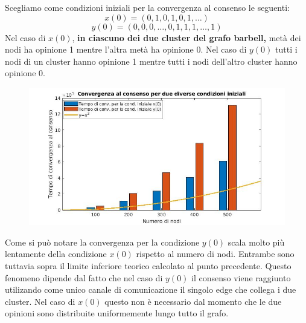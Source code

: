 \begin{alphaparts}
    \questionpart
    Scegliamo come condizioni iniziali per la convergenza al consenso le seguenti:
    \[x(0) = (0,1,0,1,0,1, \dots )\]
    \[y(0) = (0,0,0, \dots ,0,1,1,1, \dots ,1)\]
    Nel caso di \(x(0)\), \textbf{in ciascuno dei due cluster del grafo barbell, }metà dei nodi ha opinione 1 mentre l'altra metà ha opinione 0. Nel caso di \(y(0)\) tutti i nodi di un cluster hanno opinione 1 mentre tutti i nodi dell'altro cluster hanno opinione 0.

    
    \begin{figure}[H]
      \includegraphics[scale=0.45]{figures/es1_plot.jpg}  
    \end{figure}

    Come si può notare la convergenza per la condizione \(y(0)\) scala molto più lentamente della condizione \(x(0)\) rispetto al numero di nodi. Entrambe sono tuttavia sopra il limite inferiore teorico calcolato al punto precedente. Questo fenomeno dipende dal fatto che nel caso di \(y(0)\) il consenso viene raggiunto utilizando come unico canale di comunicazione il singolo edge che collega i due cluster. Nel caso di \(x(0)\) questo non è necessario dal momento che le due opinioni sono distribuite uniformemente lungo tutto il grafo.

    \end{alphaparts}